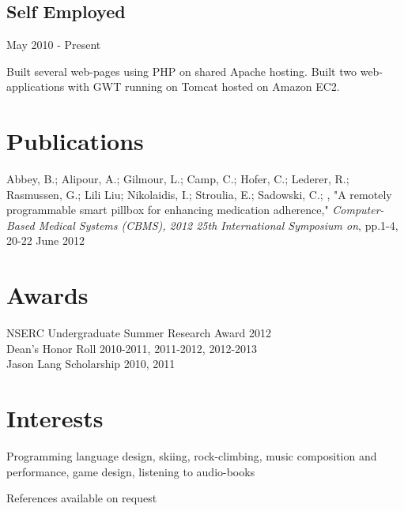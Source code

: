 \documentclass[10pt]{article}
\begin{document}
\subsection*{Self Employed}
May 2010 - Present
\vspace{\baselineskip}

Built several web-pages using PHP on shared Apache hosting. Built two web-applications with GWT running on Tomcat hosted on Amazon EC2.

\section*{Publications}
Abbey, B.; Alipour, A.; Gilmour, L.; Camp, C.; Hofer, C.; Lederer, R.; Rasmussen, G.; Lili Liu; Nikolaidis, I.; Stroulia, E.; Sadowski, C.; , "A remotely programmable smart pillbox for enhancing medication adherence," \emph{Computer-Based Medical Systems (CBMS), 2012 25th International Symposium on}, pp.1-4, 20-22 June 2012

\section*{Awards}
\noindent NSERC Undergraduate Summer Research Award \hfill 2012 \\

\noindent Dean's Honor Roll \hfill 2010-2011, 2011-2012, 2012-2013 \\

\noindent Jason Lang Scholarship \hfill 2010, 2011 \\



\section*{Interests}
Programming language design, skiing, rock-climbing, music composition and performance, game design, listening to audio-books\\

\vspace{\baselineskip}

\noindent References available on request
\end{document}
